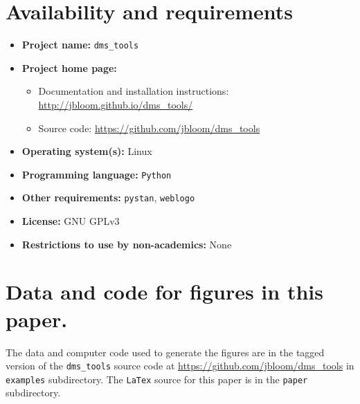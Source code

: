 \documentclass[twocolumn]{bmcart}%
\begin{document}
\section*{Availability and requirements}
\begin{itemize}
\item {\bf Project name:} \texttt{dms\_tools}
\item {\bf Project home page:}
\begin{itemize} 
\item Documentation and installation instructions: \url{http://jbloom.github.io/dms_tools/} 
\item Source code: \url{https://github.com/jbloom/dms_tools} 
\end{itemize}
\item {\bf Operating system(s):} Linux
\item {\bf Programming language:} \texttt{Python}
\item {\bf Other requirements:} \texttt{pystan}, \texttt{weblogo}
\item {\bf License:} GNU GPLv3
\item {\bf Restrictions to use by non-academics:} None
\end{itemize}

\section*{Data and code for figures in this paper.}
The data and computer code used to generate the figures are in the tagged version of the \texttt{dms\_tools} source code at \url{https://github.com/jbloom/dms_tools} in \texttt{examples} subdirectory. The \texttt{LaTex} source for this paper is in the \texttt{paper} subdirectory.

\end{document}
